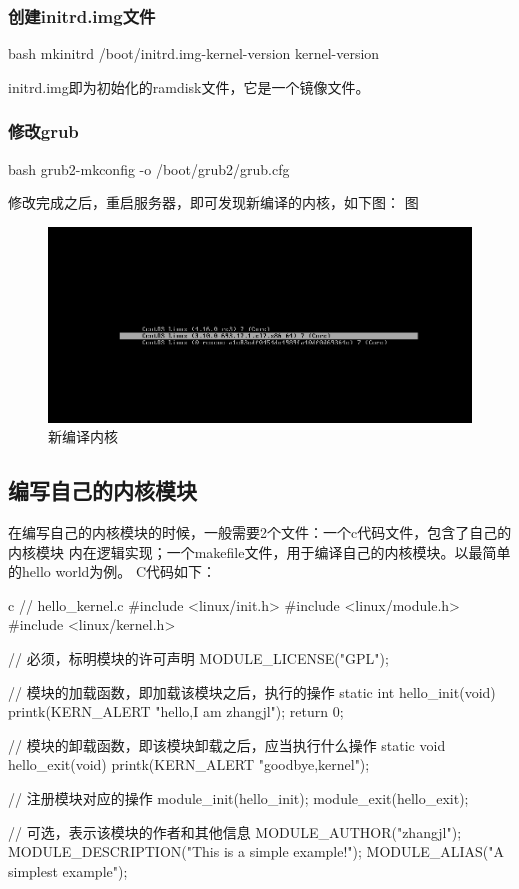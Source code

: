 \subsubsection{创建initrd.img文件}
\begin{code-block}{bash}
mkinitrd  /boot/initrd.img-{kernel-version} {kernel-version}
\end{code-block}

initrd.img即为初始化的ramdisk文件，它是一个镜像文件。

\subsubsection{修改grub}
\begin{code-block}{bash}
grub2-mkconfig -o /boot/grub2/grub.cfg
\end{code-block}

修改完成之后，重启服务器，即可发现新编译的内核，如下图：
图 
\begin{figure}[H]
  \centering
  \includegraphics[scale=0.6]{new-kernel.png}
  \caption{新编译内核 \protect\footnotemark}
  \label{fig:new-kernel}
\end{figure}

\subsection{编写自己的内核模块}
在编写自己的内核模块的时候，一般需要2个文件：一个c代码文件，包含了自己的内核模块
内在逻辑实现；一个makefile文件，用于编译自己的内核模块。以最简单的hello world为例。
C代码如下：
\begin{code-block}{c}
// hello_kernel.c
#include <linux/init.h>
#include <linux/module.h>
#include <linux/kernel.h>

// 必须，标明模块的许可声明
MODULE_LICENSE("GPL");

// 模块的加载函数，即加载该模块之后，执行的操作
static int hello_init(void)
{
    printk(KERN_ALERT "hello,I am zhangjl\n");
    return 0;
}

// 模块的卸载函数，即该模块卸载之后，应当执行什么操作
static void hello_exit(void)
{
    printk(KERN_ALERT "goodbye,kernel\n");
}

// 注册模块对应的操作
module_init(hello_init);
module_exit(hello_exit);

// 可选，表示该模块的作者和其他信息
MODULE_AUTHOR("zhangjl");
MODULE_DESCRIPTION("This is a simple example!\n");
MODULE_ALIAS("A simplest example");
\end{code-block}

